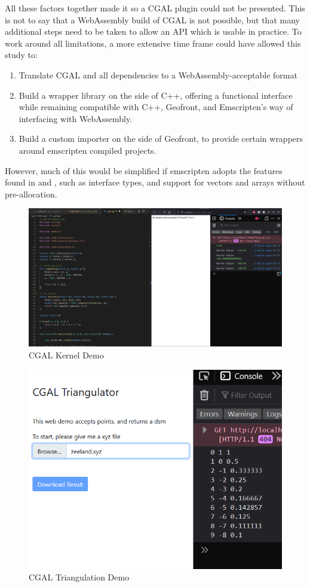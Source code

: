 All these factors together made it so a CGAL plugin could not be presented.
This is not to say that a WebAssembly build of CGAL is not possible, but that many additional steps need to be taken to allow an API which is usable in practice. 
To work around all limitations, a more extensive time frame could have allowed this study to:
\begin{enumerate}
\item Translate CGAL and all dependencies to a WebAssembly-acceptable format 
\item Build a wrapper library on the side of C++, offering a functional interface while remaining compatible with C++, Geofront, and Emscripten's way of interfacing with WebAssembly.  
\item Build a custom importer on the side of Geofront, to provide certain wrappers around emscripten compiled projects.
\end{enumerate}
However, much of this would be simplified if emscripten adopts the features found in  and , such as interface types, and support for vectors and arrays without pre-allocation. 

\begin{figure}
  \graphicspath{{../../assets/images/6.1.4/}}
  \centering
  \includegraphics[width=\linewidth]{demo-2.PNG}
  \caption[loading a plugin]{CGAL Kernel Demo}
  \label{fig:cgal-tryout-2}
\end{figure}

\begin{figure}
  \graphicspath{{../../assets/images/6.1.4/}}
  \centering
  \includegraphics[width=0.50\linewidth]{demo-3.PNG}
  \caption[loading a plugin]{CGAL Triangulation Demo}
  \label{fig:cgal-tryout-3}
\end{figure}

